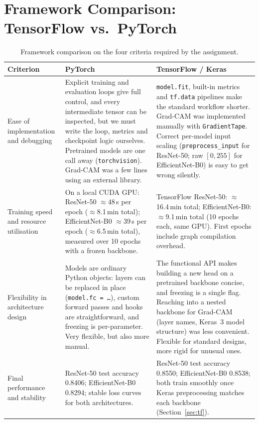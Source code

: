 \documentclass[11pt,a4paper]{article}
\begin{document}
\section{Framework Comparison: TensorFlow vs.\ PyTorch}
\label{sec:fwcomp}
\begin{table}[H]
\centering
\caption{Framework comparison on the four criteria required by the assignment.}
\label{tab:fwcomp}
\begin{tabular}{p{2.8cm}p{6.1cm}p{6.1cm}}
\toprule
\textbf{Criterion} & \textbf{PyTorch} & \textbf{TensorFlow / Keras} \\
\midrule
Ease of implementation and debugging &
Explicit training and evaluation loops give full control, and every intermediate tensor can be inspected, but we must write the loop, metrics and checkpoint logic ourselves. Pretrained models are one call away (\texttt{torchvision}). Grad-CAM was a few lines using an external library. &
\texttt{model.fit}, built-in metrics and \texttt{tf.data} pipelines make the standard workflow shorter. Grad-CAM was implemented manually with \texttt{GradientTape}. Correct per-model input scaling (\texttt{preprocess\_input} for ResNet-50; raw $[0,255]$ for EfficientNet-B0) is easy to get wrong silently. \\
\addlinespace
Training speed and resource utilisation &
On a local CUDA GPU: ResNet-50 $\approx$48\,s per epoch ($\approx$8.1\,min total); EfficientNet-B0 $\approx$39\,s per epoch ($\approx$6.5\,min total), measured over 10 epochs with a frozen backbone. &
TensorFlow ResNet-50: $\approx$16.4\,min total; EfficientNet-B0: $\approx$9.1\,min total (10 epochs each, same GPU). First epochs include graph compilation overhead. \\
\addlinespace
Flexibility in architecture design &
Models are ordinary Python objects: layers can be replaced in place (\texttt{model.fc = \dots}), custom forward passes and hooks are straightforward, and freezing is per-parameter. Very flexible, but also more manual. &
The functional API makes building a new head on a pretrained backbone concise, and freezing is a single flag. Reaching into a nested backbone for Grad-CAM (layer names, Keras~3 model structure) was less convenient. Flexible for standard designs, more rigid for unusual ones. \\
\addlinespace
Final performance and stability &
ResNet-50 test accuracy 0.8406; EfficientNet-B0 0.8294; stable loss curves for both architectures. &
ResNet-50 test accuracy 0.8550; EfficientNet-B0 0.8538; both train smoothly once Keras preprocessing matches each backbone (Section~\ref{sec:tf}). \\
\bottomrule
\end{tabular}
\end{table}
\end{document}
